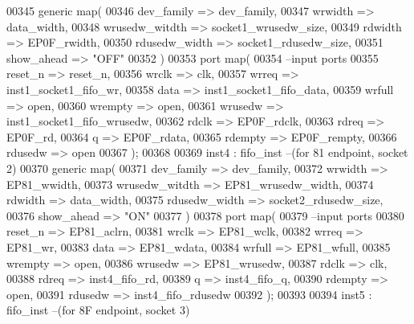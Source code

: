 \begin{DoxyCode}
00345   \textcolor{keywordflow}{generic} \textcolor{keywordflow}{map}(
00346                     dev\_family      => dev_family,
00347                     wrwidth         => data_width,
00348                     wrusedw\_witdth  => socket1_wrusedw_size,  
00349                     rdwidth         => EP0F_rwidth,
00350                     rdusedw\_width   => socket1_rdusedw_size,
00351                     show\_ahead      => \textcolor{keyword}{"OFF"}
00352   \textcolor{vhdlchar}{)}
00353   \textcolor{keywordflow}{port} \textcolor{keywordflow}{map}(
00354 \textcolor{keyword}{      --input ports }
00355       reset\_n       => reset_n,
00356       wrclk         => clk,
00357       wrreq         => inst1_socket1_fifo_wr,
00358       data          => inst1_socket1_fifo_data,
00359       wrfull        => \textcolor{keywordflow}{open},
00360         wrempty       => \textcolor{keywordflow}{open},
00361       wrusedw       => inst1_socket1_fifo_wrusedw,
00362       rdclk          => EP0F_rdclk,
00363       rdreq         => EP0F_rd,
00364       q             => EP0F_rdata,
00365       rdempty       => EP0F_rempty,
00366       rdusedw       => \textcolor{keywordflow}{open}     
00367         \textcolor{vhdlchar}{)};  
00368         
00369 inst4 : fifo_inst --(\textcolor{keywordflow}{for} \textcolor{vhdllogic}{81} endpoint, socket \textcolor{vhdllogic}{2})
00370   \textcolor{keywordflow}{generic} \textcolor{keywordflow}{map}(
00371                     dev\_family      => dev_family,
00372                     wrwidth         => EP81_wwidth,
00373                     wrusedw\_witdth  => EP81_wrusedw_width,  
00374                     rdwidth         => data_width,
00375                     rdusedw\_width   => socket2_rdusedw_size,
00376                     show\_ahead      => \textcolor{keyword}{"ON"}
00377   \textcolor{vhdlchar}{)} 
00378   \textcolor{keywordflow}{port} \textcolor{keywordflow}{map}(
00379 \textcolor{keyword}{      --input ports }
00380       reset\_n       => EP81_aclrn,
00381       wrclk         => EP81_wclk,
00382       wrreq         => EP81_wr,
00383       data          => EP81_wdata,
00384       wrfull        => EP81_wfull,
00385         wrempty       => \textcolor{keywordflow}{open},
00386       wrusedw       => EP81_wrusedw,
00387       rdclk          => clk,
00388       rdreq         => inst4_fifo_rd,
00389       q             => inst4_fifo_q,
00390       rdempty       => \textcolor{keywordflow}{open},
00391       rdusedw       => inst4_fifo_rdusedw    
00392         \textcolor{vhdlchar}{)};
00393     
00394 inst5 : fifo_inst --(\textcolor{keywordflow}{for} \textcolor{vhdllogic}{8F} endpoint, socket \textcolor{vhdllogic}{3})

\end{DoxyCode}
